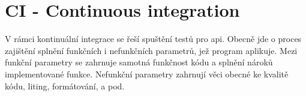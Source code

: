 \section{CI - Continuous integration}
V rámci kontinuální integrace se řeší spuštění testů pro api. Obecně jde o proces zajištění splnění funkčních i nefunkčních parametrů, jež program aplikuje. Mezi funkční parametry se zahrnuje samotná funkčnost kódu a splnění nároků implementované funkce. Nefunkční parametry zahrnují věci obecné ke kvalitě kódu, liting, formátování, a pod.
